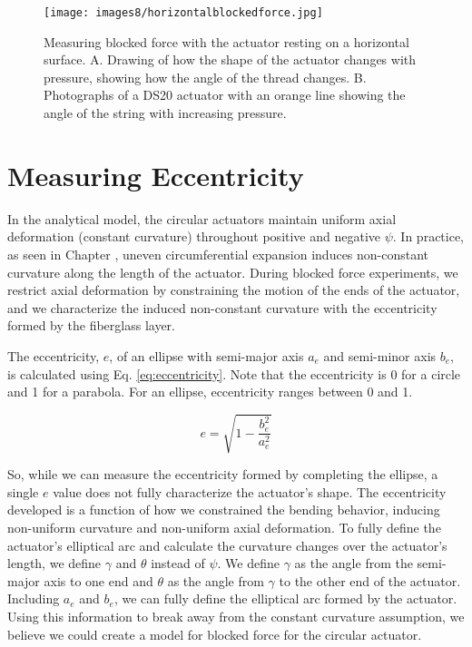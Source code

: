 \begin{figure}[ht]
    \centering
     \texttt{[image: images8/horizontalblockedforce.jpg]}
    \caption{Measuring blocked force with the actuator resting on a horizontal surface. A. Drawing of how the shape of the actuator changes with pressure, showing how the angle of the thread changes. B. Photographs of a DS20 actuator with an orange line showing the angle of the string with increasing pressure.}
    \label{fig:horizontalblockedforce}
\end{figure}

\clearpage
\section{Measuring Eccentricity}
\label{section:eccentricity}

In the analytical model, the circular actuators maintain uniform axial deformation (constant curvature) throughout positive and negative $\psi$. In practice, as seen in Chapter \label{chapter:angleresults}, uneven circumferential expansion induces non-constant curvature along the length of the actuator. During blocked force experiments, we restrict axial deformation by constraining the motion of the ends of the actuator, and we characterize the induced non-constant curvature with the eccentricity formed by the fiberglass layer. 

The eccentricity, $e$, of an ellipse with semi-major axis $a_e$ and semi-minor axis $b_e$, is calculated using Eq. \ref{eq:eccentricity}. Note that the eccentricity is 0 for a circle and 1 for a parabola. For an ellipse, eccentricity ranges between 0 and 1. 

\begin{equation}
    e = \sqrt{1-\frac{b_e^2}{a_e^2}}
    \label{eq:eccentricity}
\end{equation} 

So, while we can measure the eccentricity formed by completing the ellipse, a single $e$ value does not fully characterize the actuator's shape. The eccentricity developed is a function of how we constrained the bending behavior, inducing non-uniform curvature and non-uniform axial deformation. To fully define the actuator's elliptical arc and calculate the curvature changes over the actuator's length, we define $\gamma$ and $\theta$ instead of $\psi$. We define $\gamma$ as the angle from the semi-major axis to one end and $\theta$ as the angle from $\gamma$ to the other end of the actuator. Including $a_e$ and $b_e$, we can fully define the elliptical arc formed by the actuator. Using this information to break away from the constant curvature assumption, we believe we could create a model for blocked force for the circular actuator. 


